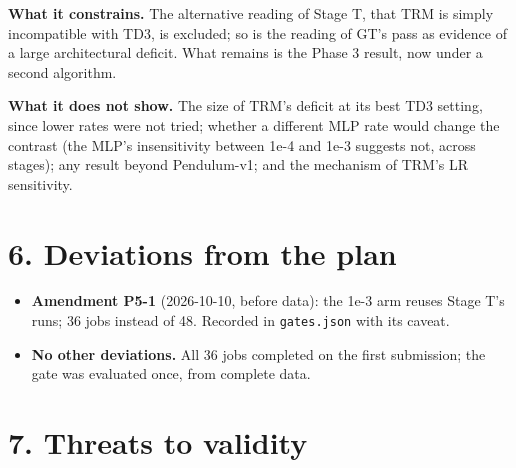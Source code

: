 \documentclass[11pt]{article}
\begin{document}
\textbf{What it constrains.} The alternative reading of Stage T, that TRM is simply incompatible with TD3, is excluded; so is the reading of GT's pass as evidence of a large architectural deficit. What remains is the Phase 3 result, now under a second algorithm.



\textbf{What it does not show.} The size of TRM's deficit at its best TD3 setting, since lower rates were not tried; whether a different MLP rate would change the contrast (the MLP's insensitivity between 1e-4 and 1e-3 suggests not, across stages); any result beyond Pendulum-v1; and the mechanism of TRM's LR sensitivity.



\section*{6. Deviations from the plan}



\begin{itemize}
\item \textbf{Amendment P5-1} (2026-10-10, before data): the 1e-3 arm reuses Stage T's runs; 36 jobs instead of 48. Recorded in \texttt{gates.json} with its caveat.
\item \textbf{No other deviations.} All 36 jobs completed on the first submission; the gate was evaluated once, from complete data.
\end{itemize}



\section*{7. Threats to validity}
\end{document}
